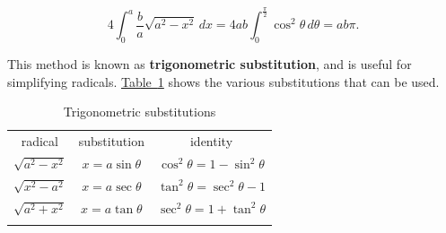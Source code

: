 \documentclass[10pt,]{book}
\newcommand{\terminology}[1]{\textbf{#1}}
\numberwithin{equation}{section}
\newcommand{\hrulethin}  {\noalign{\hrule height 0.04em}}
\newcommand{\hrulethick} {\noalign{\hrule height 0.11em}}
\begin{document}
\begin{equation*}
4\int_{0}^{a}\frac{b}{a}\sqrt{a^{2} - x^{2}}\,dx = 4ab\int_{0}^{\frac{\pi}{2}}\cos^{2}\theta\,d\theta = ab\pi.
\end{equation*}
%
\par
\hypertarget{p-544}{}%
This method is known as \terminology{trigonometric substitution}, and is useful for simplifying radicals. \hyperref[table-trig-substitutions]{Table~\ref{table-trig-substitutions}} shows the various substitutions that can be used.%
\begin{table}
\centering
\begin{tabular}{ccc}\hrulethick
radical&substitution&identity\tabularnewline\hrulethin
\(\sqrt{a^{2} - x^{2}}\)&\(x = a\sin\theta\)&\(\cos^{2}\theta = 1-\sin^{2}\theta\)\tabularnewline[0pt]
\(\sqrt{x^{2} - a^{2}}\)&\(x = a\sec\theta\)&\(\tan^{2}\theta = \sec^{2}\theta - 1\)\tabularnewline[0pt]
\(\sqrt{a^{2} + x^{2}}\)&\(x = a\tan\theta\)&\(\sec^{2}\theta = 1+\tan^{2}\theta\)\tabularnewline\hrulethick
\end{tabular}
\caption{Trigonometric substitutions\label{table-trig-substitutions}}
\end{table}
\end{document}
